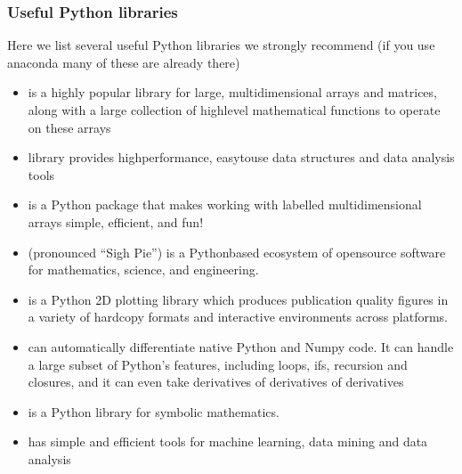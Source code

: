 \documentclass[letterpaper,10pt,english]{sphinxmanual}
\begin{document}
\subsubsection{Useful Python libraries}
\label{\detokenize{chapter2:useful-python-libraries}}
Here we list several useful Python libraries we strongly recommend (if you use anaconda many of these are already there)
\begin{itemize}
\item {} 
 is a highly popular library for large, multi\sphinxhyphen{}dimensional arrays and matrices, along with a large collection of high\sphinxhyphen{}level mathematical functions to operate on these arrays

\item {} 
 library provides high\sphinxhyphen{}performance, easy\sphinxhyphen{}to\sphinxhyphen{}use data structures and data analysis tools

\item {} 
 is a Python package that makes working with labelled multi\sphinxhyphen{}dimensional arrays simple, efficient, and fun!

\item {} 
 (pronounced “Sigh Pie”) is a Python\sphinxhyphen{}based ecosystem of open\sphinxhyphen{}source software for mathematics, science, and engineering.

\item {} 
 is a Python 2D plotting library which produces publication quality figures in a variety of hardcopy formats and interactive environments across platforms.

\item {} 
 can automatically differentiate native Python and Numpy code. It can handle a large subset of Python’s features, including loops, ifs, recursion and closures, and it can even take derivatives of derivatives of derivatives

\item {} 
 is a Python library for symbolic mathematics.

\item {} 
 has simple and efficient tools for machine learning, data mining and data analysis


\end{itemize}
\end{document}
